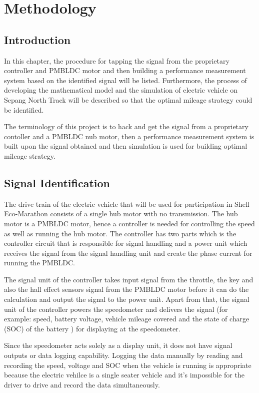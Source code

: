 \chapter{Methodology}\label{chap:methodology}
\section{Introduction}
In this chapter, the procedure for tapping the signal from the proprietary controller and PMBLDC motor and then building a performance measurement system based on the identified signal will be listed. Furthermore, the process of developing the mathematical model and the simulation of electric vehicle on Sepang North Track will be described so that the optimal mileage strategy could be identified.

The terminology of this project is to hack and get the signal from a proprietary contoller and a PMBLDC nub motor, then a performance measurement system is built upon the signal obtained and then simulation is used for building optimal mileage strategy.

\section{Signal Identification}
The drive train of the electric vehicle that will be used for participation in Shell Eco-Marathon consists of a single hub motor with no transmission. The hub motor is a PMBLDC motor, hence a controller is needed for controlling the speed as well as running the hub motor. The controller has two parts which is the controller circuit that is responsible for signal handling and a power unit which receives the signal from the signal handling unit and create the phase current for running the PMBLDC.

The signal unit of the controller takes input signal from the throttle, the key and also the hall effect sensors signal from the PMBLDC motor before it can do the calculation and output the signal to the power unit. Apart from that, the signal unit of the controller powers the speedometer and delivers the signal (for example:  speed, battery voltage, vehicle mileage covered and the state of charge (SOC) of the battery ) for displaying at the speedometer.

Since the speedometer acts solely as a display unit, it does not have signal outputs or data logging capability. Logging the data manually by reading and recording the speed, voltage and SOC when the vehicle is running is appropriate because the electric vehilce is a single seater vehicle and it's impossible for the driver to drive and record the data simultaneously. 

